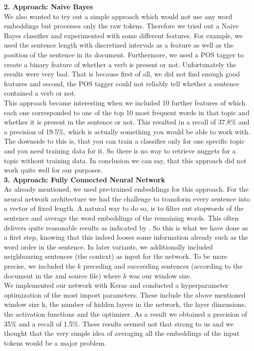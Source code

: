 \textbf{2. Approach: Naive Bayes}\\
We also wanted to try out a simple approach which would not use any word embeddings but processes only the raw tokens. Therefore we tried out a Naive Bayes classifier and experimented with some different features. For example, we used the sentence length with discretized intervals as a feature as well as the position of the sentence in its document. Furthermore, we used a POS tagger to create a binary feature of whether a verb is present or not. Unfortunately the results were very bad. That is because first of all, we did not find enough good features and second, the POS tagger could not reliably tell whether a sentence contained a verb or not.\\
This approach became interesting when we included 10 further features of which each one corresponded to one of the top 10 most frequent words in that topic and whether it is present in the sentence or not. This resulted in a recall of 37.8\% and a precision of 19.5\%, which is actually something you would be able to work with. The downside to this is, that you can train a classifier only for one specific topic and you need training data for it. So there is no way to retrieve nuggets for a topic without training data. In conclusion we can say, that this approach did not work quite well for our purposes.\\

\textbf{3. Approach: Fully Connected Neural Network}\\
As already mentioned, we used pre-trained embeddings for this approach. For the neural network architecture we had the challenge to transform every sentence into a vector of fixed length. A natural way to do so, is to filter out stopwords of the sentence and average the word embeddings of the remaining words. This often delivers quite reasonable results as indicated by \cite{iyyer2015deep}. So this is what we have done as a first step, knowing that this indeed looses some information already such as the word order in the sentence. In later variants, we additionally included neighbouring sentences (the context) as input for the network. To be more precise, we included the $k$ preceding and succeeding sentences (according to the document in the xml source file) where $k$ was our window size.\\
We implemented our network with Keras and conducted a hyperparameter optimization of the most import parameters. These include the above mentioned window size k, the number of hidden layers in the network, the layer dimensions, the activation functions and the optimizer. As a result we obtained a precision of 35\% and a recall of 1.5\%. These results seemed not that strong to us and we thought that the very simple idea of averaging all the embeddings of the input tokens would be a major problem.\\


